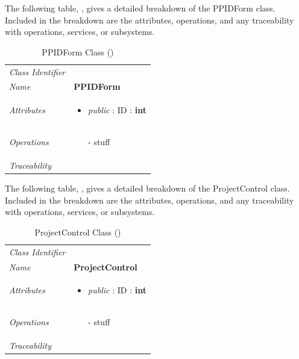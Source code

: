 \documentclass[12pt,letterpaper]{article}
\begin{document}
The following table, , gives a detailed breakdown of the PPIDForm class. Included in the breakdown are the attributes, operations, and any traceability with operations, services, or subsystems.

\begin{table}[H]
    \caption{PPIDForm Class ()} 
	\begin{tabu} to 
		\toprule
		Class Identifier &  \\
		Name & {\bf PPIDForm} \\
		Attributes & 
		\begin{minipage}[t]{\linewidth}
		    \begin{itemize}
		        \item \textit{public} : ID : \bf{int}
			\end{itemize}
	    \end{minipage} \\

		Operations &
		\begin{minipage}[t]{\linewidth}
			\begin{enumerate}
			    \item[-] stuff
	        \end{enumerate}
	    \end{minipage} \\
	    	Traceability & \\
		\toprule
	\end{tabu}
\end{table}

The following table, , gives a detailed breakdown of the ProjectControl class. Included in the breakdown are the attributes, operations, and any traceability with operations, services, or subsystems.

\begin{table}[H]
    \caption{ProjectControl Class ()} 
	\begin{tabu} to 
		\toprule
		Class Identifier &  \\
		Name & {\bf ProjectControl} \\
		Attributes & 
		\begin{minipage}[t]{\linewidth}
		    \begin{itemize}
		        \item \textit{public} : ID : \bf{int}
			\end{itemize}
	    \end{minipage} \\

		Operations &
		\begin{minipage}[t]{\linewidth}
			\begin{enumerate}
			    \item[-] stuff
	        \end{enumerate}
	    \end{minipage} \\
	    	Traceability & \\
		\toprule
	\end{tabu}
\end{table}
\end{document}

